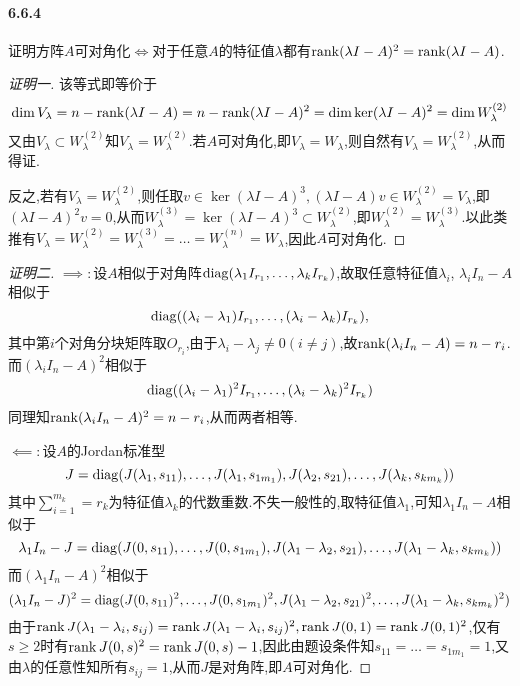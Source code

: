 \documentclass[11pt]{article}
\begin{document}
\paragraph{6.6.4}证明方阵$A$可对角化$\iff$对于任意$A$的特征值$\lambda$都有$\operatorname{rank} (\lambda I-A)^2=\operatorname{rank} (\lambda I-A)$.
\begin{proof}[证明一]
    该等式即等价于
    $$\dim V_{\lambda}=n-\operatorname{rank} (\lambda I-A)=n-\operatorname{rank} (\lambda I-A)^2=\dim \ker (\lambda I-A)^2= \dim W_{\lambda}^{(2)}$$
    又由$V_\lambda\subset W_{\lambda}^{(2)}$知$V_\lambda=W_{\lambda}^{(2)}$.若$A$可对角化,即$V_\lambda=W_\lambda$,则自然有$V_\lambda=W_{\lambda}^{(2)}$,从而得证.
    
    反之,若有$V_\lambda=W_{\lambda}^{(2)}$,则任取$v\in \ker (\lambda I-A)^3, (\lambda I-A)v\in W_{\lambda}^{(2)}=V_\lambda$,即$(\lambda I-A)^2 v=0$,从而$W_{\lambda}^{(3)}=\ker (\lambda I-A)^3\subset W_{\lambda}^{(2)}$,即$W_{\lambda}^{(2)}=W_{\lambda}^{(3)}$.以此类推有$V_\lambda=W_{\lambda}^{(2)}=W_{\lambda}^{(3)}=\dots=W_{\lambda}^{(n)}=W_\lambda$,因此$A$可对角化.
\end{proof}
\begin{proof}[证明二]
    $\implies:$设$A$相似于对角阵$\operatorname{diag}(\lambda_1 I_{r_1},\dots,\lambda_k I_{r_k})$,故取任意特征值$\lambda_i$, $\lambda_i I_n-A$相似于
    $$\operatorname{diag}((\lambda_i-\lambda_1) I_{r_1}, \dots, (\lambda_i-\lambda_k) I_{r_k}),$$
    其中第$i$个对角分块矩阵取$O_{r_i}$,由于$\lambda_i-\lambda_j\neq 0 (i\neq j)$,故$\operatorname{rank} (\lambda_i I_n-A)=n-r_i$.而$(\lambda_i I_n-A)^2$相似于
    $$\operatorname{diag}((\lambda_i-\lambda_1)^2 I_{r_1}, \dots, (\lambda_i-\lambda_k)^2 I_{r_k})$$
    同理知$\operatorname{rank} (\lambda_i I_n-A)^2=n-r_i$,从而两者相等.

    $\impliedby:$设$A$的Jordan标准型
    $$J=\operatorname{diag}(J(\lambda_1,s_{11}),\dots,J(\lambda_1,s_{1m_1}),J(\lambda_2,s_{21}),\dots,J(\lambda_k,s_{km_k}))$$
    其中$\sum_{i=1}^{m_k}=r_k$为特征值$\lambda_k$的代数重数.不失一般性的,取特征值$\lambda_1$,可知$\lambda_1 I_n-A$相似于
    $$\lambda_1 I_n-J=\operatorname{diag}(J(0,s_{11}),\dots,J(0,s_{1m_1}),J(\lambda_1-\lambda_2,s_{21}),\dots,J(\lambda_1-\lambda_k,s_{km_k}))$$
    而$(\lambda_1 I_n-A)^2$相似于
    $$(\lambda_1 I_n-J)^2=\operatorname{diag}(J(0,s_{11})^2,\dots,J(0,s_{1m_1})^2,J(\lambda_1-\lambda_2,s_{21})^2,\dots,J(\lambda_1-\lambda_k,s_{km_k})^2)$$
    由于$\operatorname{rank} J(\lambda_1-\lambda_i,s_{ij})=\operatorname{rank} J(\lambda_1-\lambda_i,s_{ij})^2, \operatorname{rank} J(0,1)=\operatorname{rank} J(0,1)^2$,仅有$s\geq 2$时有$\operatorname{rank} J(0,s)^2=\operatorname{rank} J(0,s)-1$,因此由题设条件知$s_{11}=\dots=s_{1m_1}=1$,又由$\lambda$的任意性知所有$s_{ij}=1$,从而$J$是对角阵,即$A$可对角化.
\end{proof}
\end{document}
